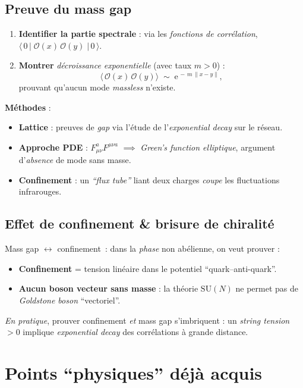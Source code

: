 \documentclass[11pt]{article}
\begin{document}
\subsection{Preuve du mass gap}
\label{ssec:mass_gap}

\begin{enumerate}
  \item \textbf{Identifier la partie spectrale} : via les \emph{fonctions de corrélation}, $\langle\,0\,|\;\mathcal{O}(x)\,\mathcal{O}(y)\;|\,0\,\rangle$.
  \item \textbf{Montrer} \emph{décroissance exponentielle} (avec taux $m>0$) :
  \[
    \langle\,\mathcal{O}(x)\,\mathcal{O}(y)\rangle
    \;\sim\;
    \mathrm{e}^{\,-\,m\,\|x-y\|},
  \]
  prouvant qu'aucun mode \emph{massless} n'existe.
\end{enumerate}

\noindent
\textbf{Méthodes} :
\begin{itemize}
  \item \textbf{Lattice} : preuves de \emph{gap} via l'étude de l'\emph{exponential decay} sur le réseau.  
  \item \textbf{Approche PDE} : $F_{\mu\nu}^aF^{\mu\nu a}$ $\implies$ \emph{Green's function elliptique}, argument d'\emph{absence} de mode sans masse.
  \item \textbf{Confinement} : un \emph{“flux tube”} liant deux charges \emph{coupe} les fluctuations infrarouges. 
\end{itemize}

\subsection{Effet de confinement \& brisure de chiralité}
Mass gap $\leftrightarrow$ confinement~: dans la \emph{phase} non abélienne, on veut prouver :
\begin{itemize}
  \item \textbf{Confinement} = tension linéaire dans le potentiel “quark--anti-quark”.
  \item \textbf{Aucun boson vecteur sans masse} : la théorie $\mathrm{SU}(N)$ ne permet pas de \emph{Goldstone boson} “vectoriel”.
\end{itemize}
\noindent
\emph{En pratique}, prouver confinement \emph{et} mass gap s'imbriquent : un \emph{string tension} $>0$ implique \emph{exponential decay} des corrélations à grande distance.

\section{Points “physiques” déjà acquis}
\end{document}
